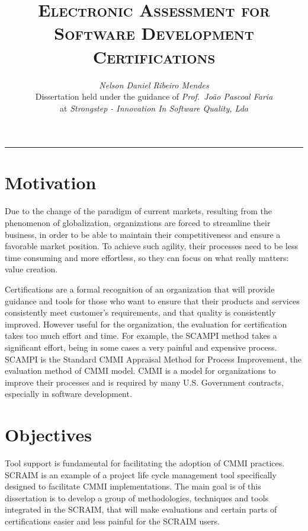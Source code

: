 \documentclass[9pt,a4paper]{extarticle}
\begin{document}
\title{\vspace*{-8mm}\textbf{\textsc{Electronic Assessment for Software Development Certifications}}}
\author{\emph{Nelson Daniel Ribeiro Mendes}\\[2mm]
\small{Dissertation held under the guidance of \emph{Prof.\ João Pascoal Faria}}\\
\small{at \emph{Strongstep - Innovation In Software Quality, Lda}}}
\date{}
\maketitle
\thispagestyle{empty}

\vspace*{-4mm}\noindent\rule{\textwidth}{0.4pt}\vspace*{4mm}

\begin{multicols}{2}

\section{Motivation}\label{sec:motiva}

Due to the change of the paradigm of current markets, resulting from the phenomenon of globalization, organizations are forced to streamline their business, in order to be able to maintain their competitiveness and ensure a favorable market position. To achieve such agility, their processes need to be less time consuming and more effortless, so they can focus on what really matters: value creation.

Certifications are a formal recognition of an organization that will provide guidance and tools for those who want to ensure that their products and services consistently meet customer's requirements, and that quality is consistently improved. However useful for the organization, the evaluation for certification takes too much effort and time. For example, the SCAMPI method takes a significant effort, being in some cases a very painful and expensive process. SCAMPI is the Standard CMMI Appraisal Method for Process Improvement, the evaluation method of CMMI model. CMMI is a model for organizations to improve their processes and is required by many U.S. Government contracts, especially in software development. 



\section{Objectives}\label{sec:goals}
Tool support is fundamental for facilitating the adoption of CMMI practices. SCRAIM \cite{SCRAIM} is an example of a project life cycle management tool specifically designed to facilitate CMMI implementations.
The main goal is of this dissertation is to develop a group of methodologies, techniques and tools integrated in the SCRAIM, that will make evaluations and certain parts of certifications easier and less painful for the SCRAIM users.


\end{multicols}
\end{document}
